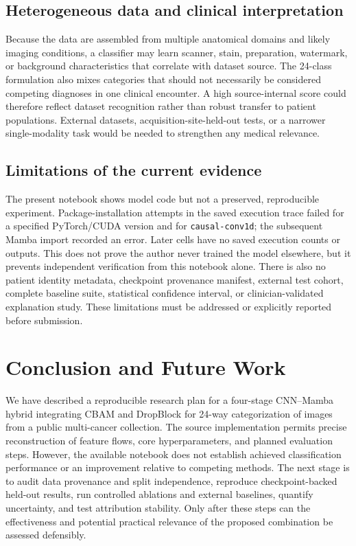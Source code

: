 \documentclass[11pt,a4paper]{article}
\begin{document}
\subsection{Heterogeneous data and clinical interpretation}
Because the data are assembled from multiple anatomical domains and likely imaging conditions, a classifier may learn scanner, stain, preparation, watermark, or background characteristics that correlate with dataset source. The 24-class formulation also mixes categories that should not necessarily be considered competing diagnoses in one clinical encounter. A high source-internal score could therefore reflect dataset recognition rather than robust transfer to patient populations. External datasets, acquisition-site-held-out tests, or a narrower single-modality task would be needed to strengthen any medical relevance.

\subsection{Limitations of the current evidence}
The present notebook shows model code but not a preserved, reproducible experiment. Package-installation attempts in the saved execution trace failed for a specified PyTorch/CUDA version and for \texttt{causal-conv1d}; the subsequent Mamba import recorded an error. Later cells have no saved execution counts or outputs. This does not prove the author never trained the model elsewhere, but it prevents independent verification from this notebook alone. There is also no patient identity metadata, checkpoint provenance manifest, external test cohort, complete baseline suite, statistical confidence interval, or clinician-validated explanation study. These limitations must be addressed or explicitly reported before submission.

\section{Conclusion and Future Work}\label{sec:conclusion}
We have described a reproducible research plan for a four-stage CNN--Mamba hybrid integrating CBAM and DropBlock for 24-way categorization of images from a public multi-cancer collection. The source implementation permits precise reconstruction of feature flows, core hyperparameters, and planned evaluation steps. However, the available notebook does not establish achieved classification performance or an improvement relative to competing methods. The next stage is to audit data provenance and split independence, reproduce checkpoint-backed held-out results, run controlled ablations and external baselines, quantify uncertainty, and test attribution stability. Only after these steps can the effectiveness and potential practical relevance of the proposed combination be assessed defensibly.
\end{document}
